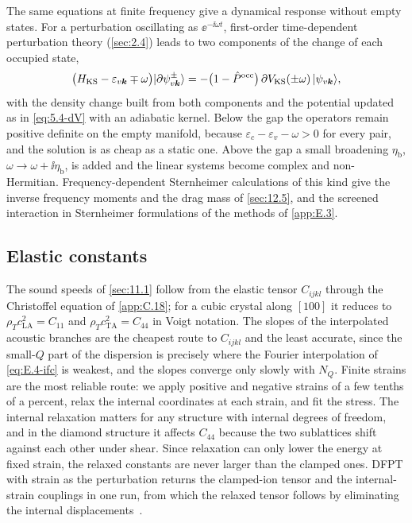 The same equations at finite frequency give a dynamical response without empty states. For a perturbation oscillating as $\ee^{-\ii\omega t}$, first-order time-dependent perturbation theory (\cref{sec:2.4}) leads to two components of the change of each occupied state,
\begin{equation}
  \bigl(H_{\mathrm{KS}} - \varepsilon_{v\bm{k}} \mp \omega\bigr)|\partial\psi^{\pm}_{v\bm{k}}\rangle = -\bigl(1 - \hat{P}^{\mathrm{occ}}\bigr)\,\partial V_{\mathrm{KS}}(\pm\omega)\,|\psi_{v\bm{k}}\rangle ,
  \label{eq:E.4-sthw}
\end{equation}
with the density change built from both components and the potential updated as in \cref{eq:5.4-dV} with an adiabatic kernel. Below the gap the operators remain positive definite on the empty manifold, because $\varepsilon_c - \varepsilon_v - \omega > 0$ for every pair, and the solution is as cheap as a static one. Above the gap a small broadening $\eta_{\mathrm{b}}$, $\omega \to \omega + \ii\eta_{\mathrm{b}}$, is added and the linear systems become complex and non-Hermitian. Frequency-dependent Sternheimer calculations of this kind give the inverse frequency moments and the drag mass of \cref{sec:12.5}, and the screened interaction in Sternheimer formulations of the methods of \cref{app:E.3}.

\subsection{Elastic constants}

The sound speeds of \cref{sec:11.1} follow from the elastic tensor $C_{ijkl}$ through the Christoffel equation of \cref{app:C.18}; for a cubic crystal along $[100]$ it reduces to $\rho_T c_{\mathrm{LA}}^2 = C_{11}$ and $\rho_T c_{\mathrm{TA}}^2 = C_{44}$ in Voigt notation. The slopes of the interpolated acoustic branches are the cheapest route to $C_{ijkl}$ and the least accurate, since the small-$Q$ part of the dispersion is precisely where the Fourier interpolation of \cref{eq:E.4-ifc} is weakest, and the slopes converge only slowly with $N_Q$. Finite strains are the most reliable route: we apply positive and negative strains of a few tenths of a percent, relax the internal coordinates at each strain, and fit the stress. The internal relaxation matters for any structure with internal degrees of freedom, and in the diamond structure it affects $C_{44}$ because the two sublattices shift against each other under shear. Since relaxation can only lower the energy at fixed strain, the relaxed constants are never larger than the clamped ones. DFPT with strain as the perturbation returns the clamped-ion tensor and the internal-strain couplings in one run, from which the relaxed tensor follows by eliminating the internal displacements~\cite[Sect.~II.E.1]{baroni2001phonons}.

